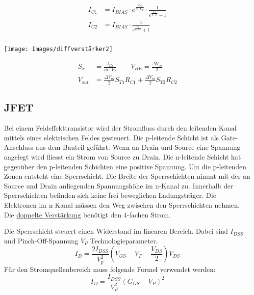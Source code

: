 \begin{minipage}{0.30\textwidth}
	\begin{align*}
		I_{C1} &= I_{BIAS} \cdot e^{\frac{V_D}{n\cdot V_T}} \cdot \frac{1}{e^{\frac{V_D}{n\cdot V_T}} + 1} \\
		I_{C2} &= I_{BIAS} \cdot \frac{1}{e^{\frac{V_D}{n\cdot V_T}} + 1} \\
	\end{align*}
\end{minipage}
\begin{minipage}{0.20\textwidth}
	\texttt{[image: Images/diffverstärker2]}
\end{minipage}%
\begin{minipage}{0.30\textwidth}
	\begin{align*}
		S_{x} &= \frac{I_{Cx}}{m\cdot V_T} \qquad V_{BE} = \frac{\Delta V_{in}}{2} \\
		V_{out} &= \frac{\Delta V_{in}}{2} S_{T1}R_{C1} + \frac{\Delta V_{in}}{2} S_{T2}R_{C2}
	\end{align*}
\end{minipage}




\subsection{JFET}
Bei einem Feldeffekttransistor wird der Stromfluss durch den leitenden Kanal mittels eines elektrischen Feldes gesteuert. Die p-leitende Schicht ist als Gate-Anschluss aus dem Bauteil geführt. Wenn an Drain und Source eine Spannung angelegt wird fliesst ein Strom von Source zu Drain. Die n-leitende Schicht hat gegenüber den p-leitenden Schichten eine positive Spannung. Um die p-leitenden Zonen entsteht eine Sperrschicht. Die Breite der Sperrschichten nimmt mit der an Source und Drain anliegenden Spannungshöhe im n-Kanal zu. Innerhalb der Sperrschichten befinden sich keine frei beweglichen Ladungsträger. Die Elektronen im n-Kanal müssen den Weg zwischen den Sperrschichten nehmen. Die \underline{doppelte Verstärkung} benötigt den 4-fachen Strom.

Die Sperrschicht steuert einen Widerstand im linearen Bereich. Dabei sind $I_{DSS}$ und Pinch-Off-Spannung $V_P$ Technologieparameter.
\[
I_D = \frac{2I_{DSS}}{V_p^2}\left(V_{GS} - V_P - \frac{V_{DS}}{2}\right)V_{DS}
\]
Für den Stromquellenbereich muss folgende Formel verwendet werden:
\[
I_D = \frac{I_{DSS}}{V_P^2}\left(G_{GS} - V_P\right)^2
\]

